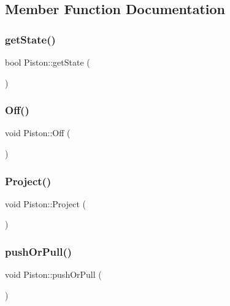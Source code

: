 \subsection{Member Function Documentation}
\mbox{\label{classPiston_aee30a006d82ac06ed12ea36d2d435708}} 
\subsubsection{\texorpdfstring{get\+State()}{getState()}}
{\footnotesize\ttfamily bool Piston\+::get\+State (\begin{DoxyParamCaption}{ }\end{DoxyParamCaption})\hspace{0.3cm}{\ttfamily [inline]}}

\mbox{\label{classPiston_a44a19e212f16a4793b125d2725c470ce}} 
\subsubsection{\texorpdfstring{Off()}{Off()}}
{\footnotesize\ttfamily void Piston\+::\+Off (\begin{DoxyParamCaption}{ }\end{DoxyParamCaption})\hspace{0.3cm}{\ttfamily [inline]}}

\mbox{\label{classPiston_ad02eef5cfb0ed9f92ee4605dadb46440}} 
\subsubsection{\texorpdfstring{Project()}{Project()}}
{\footnotesize\ttfamily void Piston\+::\+Project (\begin{DoxyParamCaption}{ }\end{DoxyParamCaption})\hspace{0.3cm}{\ttfamily [inline]}}

\mbox{\label{classPiston_ad41333bdc156996df7552b766073be3d}} 
\subsubsection{\texorpdfstring{push\+Or\+Pull()}{pushOrPull()}}
{\footnotesize\ttfamily void Piston\+::push\+Or\+Pull (\begin{DoxyParamCaption}{ }\end{DoxyParamCaption})\hspace{0.3cm}{\ttfamily [inline]}}

